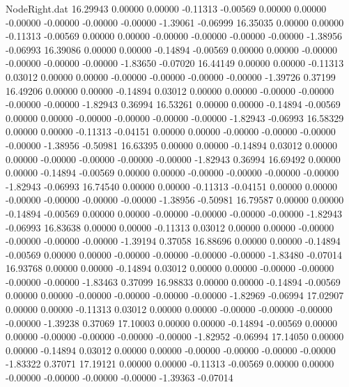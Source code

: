 \begin{filecontents}{NodeRight.dat}
  16.29943    0.00000    0.00000    -0.11313   -0.00569    0.00000    0.00000   -0.00000   -0.00000   -0.00000   -0.00000   -1.39061   -0.06999
  16.35035    0.00000    0.00000    -0.11313   -0.00569    0.00000    0.00000   -0.00000   -0.00000   -0.00000   -0.00000   -1.38956   -0.06993
  16.39086    0.00000    0.00000    -0.14894   -0.00569    0.00000    0.00000   -0.00000   -0.00000   -0.00000   -0.00000   -1.83650   -0.07020
  16.44149    0.00000    0.00000    -0.11313    0.03012    0.00000    0.00000   -0.00000   -0.00000   -0.00000   -0.00000   -1.39726    0.37199
  16.49206    0.00000    0.00000    -0.14894    0.03012    0.00000    0.00000   -0.00000   -0.00000   -0.00000   -0.00000   -1.82943    0.36994
  16.53261    0.00000    0.00000    -0.14894   -0.00569    0.00000    0.00000   -0.00000   -0.00000   -0.00000   -0.00000   -1.82943   -0.06993
  16.58329    0.00000    0.00000    -0.11313   -0.04151    0.00000    0.00000   -0.00000   -0.00000   -0.00000   -0.00000   -1.38956   -0.50981
  16.63395    0.00000    0.00000    -0.14894    0.03012    0.00000    0.00000   -0.00000   -0.00000   -0.00000   -0.00000   -1.82943    0.36994
  16.69492    0.00000    0.00000    -0.14894   -0.00569    0.00000    0.00000   -0.00000   -0.00000   -0.00000   -0.00000   -1.82943   -0.06993
  16.74540    0.00000    0.00000    -0.11313   -0.04151    0.00000    0.00000   -0.00000   -0.00000   -0.00000   -0.00000   -1.38956   -0.50981
  16.79587    0.00000    0.00000    -0.14894   -0.00569    0.00000    0.00000   -0.00000   -0.00000   -0.00000   -0.00000   -1.82943   -0.06993
  16.83638    0.00000    0.00000    -0.11313    0.03012    0.00000    0.00000   -0.00000   -0.00000   -0.00000   -0.00000   -1.39194    0.37058
  16.88696    0.00000    0.00000    -0.14894   -0.00569    0.00000    0.00000   -0.00000   -0.00000   -0.00000   -0.00000   -1.83480   -0.07014
  16.93768    0.00000    0.00000    -0.14894    0.03012    0.00000    0.00000   -0.00000   -0.00000   -0.00000   -0.00000   -1.83463    0.37099
  16.98833    0.00000    0.00000    -0.14894   -0.00569    0.00000    0.00000   -0.00000   -0.00000   -0.00000   -0.00000   -1.82969   -0.06994
  17.02907    0.00000    0.00000    -0.11313    0.03012    0.00000    0.00000   -0.00000   -0.00000   -0.00000   -0.00000   -1.39238    0.37069
  17.10003    0.00000    0.00000    -0.14894   -0.00569    0.00000    0.00000   -0.00000   -0.00000   -0.00000   -0.00000   -1.82952   -0.06994
  17.14050    0.00000    0.00000    -0.14894    0.03012    0.00000    0.00000   -0.00000   -0.00000   -0.00000   -0.00000   -1.83322    0.37071
  17.19121    0.00000    0.00000    -0.11313   -0.00569    0.00000    0.00000   -0.00000   -0.00000   -0.00000   -0.00000   -1.39363   -0.07014

\end{filecontents}

